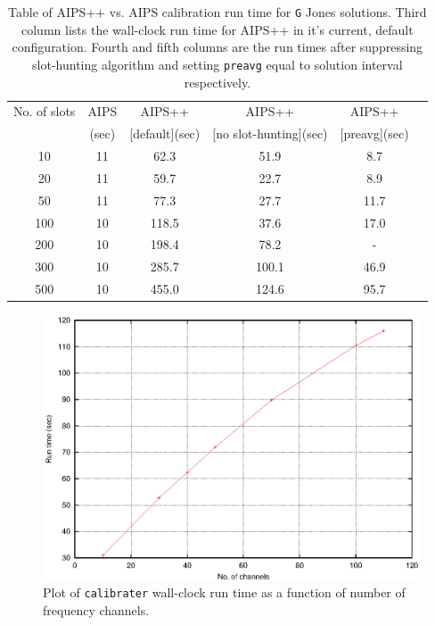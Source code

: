 \begin{table}[h!]
\begin{center}
\caption{\small Table of AIPS++ vs. AIPS calibration run time for {\tt G}
Jones solutions. Third column lists the wall-clock run time for AIPS++
in it's current, default configuration.  Fourth and fifth columns are
the run times after suppressing slot-hunting algorithm and setting
{\tt preavg} equal to solution interval respectively.}
\label{CALIB_TAB}
\vskip 0.5cm
\begin{tabular}{|c|c|c|c|c|c|}
\hline
No. of slots& AIPS &     AIPS++    &         AIPS++        &    AIPS++\\
            & (sec)& [default](sec)& [no slot-hunting](sec)& [preavg](sec)\\
\hline
10          &  11  &     62.3      &         51.9          &  8.7 \\
20          &  11  &     59.7      &         22.7          &  8.9 \\
50          &  11  &     77.3      &         27.7          & 11.7 \\
100         &  10  &    118.5      &         37.6          & 17.0 \\
200         &  10  &    198.4      &         78.2          &  -   \\
300         &  10  &    285.7      &        100.1          & 46.9 \\
500         &  10  &    455.0      &        124.6          & 95.7 \\
\hline
\end{tabular}
\end{center}
\end{table}
\begin{figure}[!h]
\begin{center}
  \includegraphics[scale=0.9]{BPTime.ps}
\caption[AIPS++ {\tt calibrater} performance for {\tt B}Jones]{\small Plot of
{\tt calibrater} wall-clock    run time as a  function    of number of
frequency channels.}
\label{BP_PLOT}
\end{center}
\end{figure}

